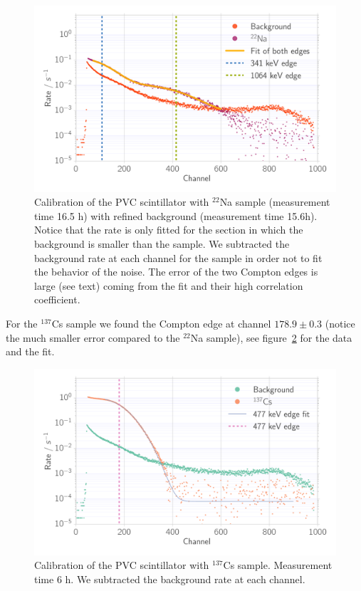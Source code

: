 \begin{figure}[htpb]
    \centering
    \includegraphics[width=0.9\linewidth]{./analysis/figures/calib_ps_na}
    \caption{Calibration of the PVC scintillator with $^{22}$Na sample (measurement time
    16.5 h) with refined background (measurement time 15.6h). Notice that the rate is 
    only fitted for the section in which the background is smaller than the sample. We
    subtracted the background rate at each channel for the sample in order not to fit the 
    behavior of the noise. The error of the two Compton edges is large (see text) coming
    from the fit and their high correlation coefficient.}
\label{fig:calib_ps_na}
\end{figure}
For the $^{137}$Cs sample we found the Compton edge at channel $178.9 \pm 0.3$ 
(notice the much smaller error compared to the $^{22}$Na sample), 
see figure~\ref{fig:calib_ps_cs} for the data and the fit.
\begin{figure}[htpb]
    \centering
    \includegraphics[width=0.9\linewidth]{./analysis/figures/calib_ps_cs}
    \caption{Calibration of the PVC scintillator with $^{137}$Cs sample. Measurement time
    6 h. We subtracted the background rate at each channel. }
\label{fig:calib_ps_cs}
\end{figure}

